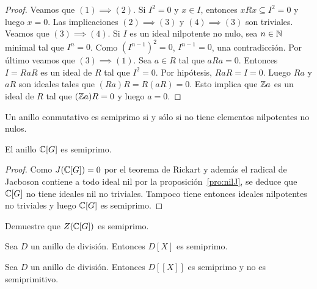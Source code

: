 \begin{proof}
	Veamos que $(1)\implies(2)$. Si $I^2=0$ y $x\in I$, entonces $xRx\subseteq I^2=0$ y
	luego $x=0$. Las implicaciones $(2)\implies(3)$ y $(4)\implies(3)$ son triviales. Veamos que
	$(3)\implies(4)$.  Si $I$ es un ideal nilpotente no nulo, sea $n\in\mathbb{N}$
	minimal tal que $I^n=0$.  Como $(I^{n-1})^2=0$, $I^{n-1}=0$, una
	contradicción. Por último veamos que $(3)\implies(1)$. Sea $a\in R$ tal que
	$aRa=0$. Entonces $I=RaR$ es un ideal de $R$ tal que $I^2=0$. Por hipótesis, $RaR=I=0$. Luego
	$Ra$ y $aR$ son ideales tales que $(Ra)R=R(aR)=0$. Esto implica que $\mathbb{Z} a$ es un ideal de $R$
	tal que $(\mathbb{Z} a)R=0$ y luego $a=0$.
\end{proof}

\begin{example}
	Un anillo conmutativo es semiprimo si y sólo si no tiene elementos
	nilpotentes no nulos.
\end{example}


\begin{proposition}
	El anillo $\mathbb{C}[G]$ es semiprimo.
\end{proposition}

\begin{proof}
	Como $J(\mathbb{C}[G])=0$ por el teorema de Rickart y además el radical de Jacboson
	contiene a todo ideal nil por la proposición~\ref{pro:nilJ}, se deduce que
	$\mathbb{C}[G]$ no tiene ideales nil no triviales. Tampoco tiene entonces ideales
	nilpotentes no triviales y luego $\mathbb{C}[G]$ es semiprimo.
\end{proof}

\begin{exercise}
	Demuestre que $Z(\mathbb{C}[G])$ es semiprimo.
\end{exercise}


\begin{example}
	Sea $D$ un anillo de división. Entonces $D[X]$ es semiprimo.
\end{example}

\begin{example}
	Sea $D$ un anillo de división. Entonces $D[[X]]$ es semiprimo y no es
	semiprimitivo.
\end{example}




